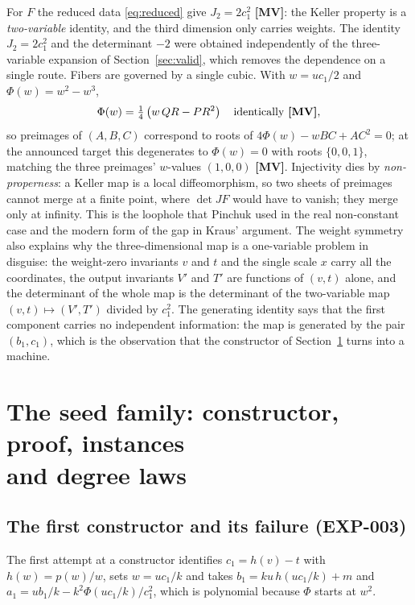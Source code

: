 \documentclass[11pt]{article}
\theoremstyle{definition}
\theoremstyle{remark}
\newcommand{\detJ}{\det JF}
\newcommand{\MV}{\textbf{[MV]}}
\begin{document}
For $F$ the reduced data \eqref{eq:reduced} give $J_2 = 2 c_1^2$ \MV: the Keller property is a \emph{two-variable} identity, and the third dimension only carries weights. The identity $J_2 = 2c_1^2$ and the determinant $-2$ were obtained independently of the three-variable expansion of Section~\ref{sec:valid}, which removes the dependence on a single route. Fibers are governed by a single cubic. With $w = u c_1 / 2$ and $\Phi(w) = w^2 - w^3$,
\begin{equation}\label{eq:fiber}
\Phi(w) = \tfrac14\left(w\, QR - P R^2\right) \quad \text{identically \MV},
\end{equation}
so preimages of $(A, B, C)$ correspond to roots of $4\Phi(w) - w BC + A C^2 = 0$; at the announced target this degenerates to $\Phi(w) = 0$ with roots $\{0, 0, 1\}$, matching the three
preimages' $w$-values $(1, 0, 0)$ \MV. Injectivity dies by \emph{non-properness}: a Keller map is a local diffeomorphism, so two sheets of preimages cannot merge at a finite point, where $\detJ$ would have to vanish; they merge only at infinity. This is the loophole that Pinchuk used in the real non-constant case and the modern form of the gap in Kraus' argument. The weight symmetry also explains why the three-dimensional map is a one-variable problem in disguise: the weight-zero invariants $v$ and $t$ and the single scale $x$ carry all the coordinates, the output invariants $V'$ and $T'$ are functions of $(v,t)$ alone, and the determinant of the whole map is the determinant of the two-variable map $(v,t) \mapsto (V',T')$ divided by $c_1^2$. The generating identity says that the first component carries no independent information: the map is generated by the pair $(b_1, c_1)$, which is the observation that the constructor of Section~\ref{sec:family} turns into a machine.

\section[The seed family: constructor, proof, instances and degree laws]{The seed family: constructor, proof, instances\\ and degree laws}\label{sec:family}

\subsection{The first constructor and its failure (EXP-003)}\label{sec:first}

The first attempt at a constructor identifies $c_1 = h(v) - t$ with $h(w) = p(w)/w$, sets $w = uc_1/k$ and takes $b_1 = k u\, h(u c_1/k) + m$ and $a_1 = u b_1/k - k^2\Phi(uc_1/k)/c_1^2$, which is polynomial because $\Phi$ starts at $w^2$.
\end{document}
